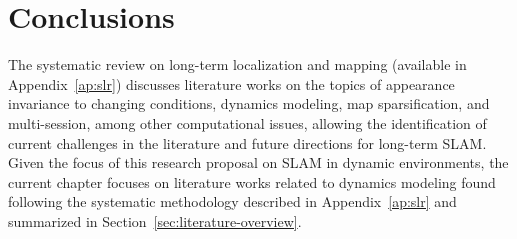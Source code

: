 \section{Conclusions}\label{sec:literature:conclusions}

The systematic review on long-term localization and mapping (available in Appendix~\ref{ap:slr}) discusses literature works on the topics of appearance invariance to changing conditions, dynamics modeling, map sparsification, and multi-session, among other computational issues, allowing the identification of current challenges in the literature and future directions for long-term \gls{SLAM}.
Given the focus of this research proposal on \gls{SLAM} in dynamic environments, the current chapter focuses on literature works related to dynamics modeling found following the systematic methodology described in Appendix~\ref{ap:slr} and summarized in Section~\ref{sec:literature-overview}.

